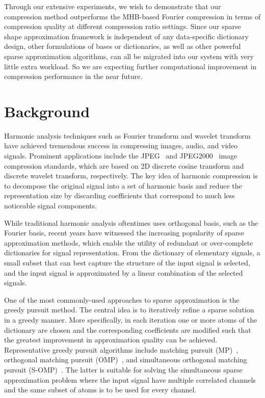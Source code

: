 Through our extensive experiments, we wish to demonstrate that our
compression method outperforms the MHB-based Fourier compression in
terms of compression quality at different compression ratio settings.
Since our sparse shape approximation framework is independent of any
data-specific dictionary design, other formulations of bases or
dictionaries, as well as other powerful sparse approximation
algorithms, can all be migrated into our system with very little extra
workload. So we are expecting further computational improvement in
compression performance in the near future.

\section{Background}

Harmonic analysis techniques such as Fourier transform and wavelet
transform have achieved tremendous success in compressing images,
audio, and video signals. Prominent applications include the
JPEG~\cite{wallace1992jpeg} and JPEG2000~\cite{skodras2001jpeg} image
compression standards, which are based on 2D discrete cosine transform
and discrete wavelet transform, respectively. The key idea of harmonic
compression is to decompose the original signal into a set of harmonic
basis and reduce the representation size by discarding coefficients
that correspond to much less noticeable signal components.

While traditional harmonic analysis oftentimes uses orthogonal basis,
such as the Fourier basis, recent years have witnessed the increasing
popularity of sparse approximation methods, which enable the utility
of redundant or over-complete dictionaries for signal representation.
From the dictionary of elementary signals, a small subset that can
best capture the structure of the input signal is selected, and the
input signal is approximated by a linear combination of the selected
signals.

One of the most commonly-used approaches to sparse approximation is
the greedy pursuit method. The central idea is to iteratively refine a
sparse solution in a greedy manner. More specifically, in each
iteration one or more atoms of the dictionary are chosen
and the corresponding coefficients are modified
such that the greatest improvement in approximation quality can be achieved.
Representative greedy pursuit algorithms include matching pursuit
(MP)~\cite{Mallat1993}, orthogonal matching pursuit
(OMP)~\cite{Pati1993}, and simultaneous orthogonal matching pursuit (S-OMP)~\cite{Tropp2006a}.
The latter is suitable for solving the simultaneous sparse approximation problem where
the input signal have multiple correlated channels and the same subset of atoms is to be used
for every channel.

